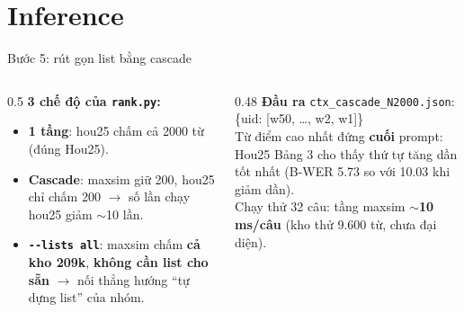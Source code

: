 \documentclass[aspectratio=169,xcolor=table]{beamer}
\newcommand{\hi}[1]{\textcolor{Primary}{\textbf{#1}}}
\begin{document}
\section{Inference}
\begin{frame}{Bước 5: rút gọn list bằng cascade}
\begin{center}
\end{center}
\vspace{0.1cm}
\footnotesize
\begin{columns}[T]
\begin{column}{0.5\textwidth}
\textbf{3 chế độ của \texttt{rank.py}:}
\begin{itemize}\itemsep2pt
\item \textbf{1 tầng}: hou25 chấm cả 2000 từ (đúng Hou25).
\item \textbf{Cascade}: maxsim giữ 200, hou25 chỉ chấm 200 $\rightarrow$ số lần chạy hou25 giảm $\sim$10 lần.
\item \textbf{\texttt{-{}-lists all}}: maxsim chấm \hi{cả kho 209k}, \textbf{không cần list cho sẵn} $\rightarrow$ nối thẳng hướng ``tự dựng list'' của nhóm.
\end{itemize}
\end{column}
\begin{column}{0.48\textwidth}
\textbf{Đầu ra} \texttt{ctx\_cascade\_N2000.json}:\\[2pt]
\colorbox{SoftGray}{\ttfamily\scriptsize \{uid: [w50, \dots, w2, w1]\}}\\[3pt]
Từ điểm cao nhất đứng \textbf{cuối} prompt: Hou25 Bảng 3 cho thấy thứ tự tăng dần tốt nhất (B-WER 5.73 so với 10.03 khi giảm dần).\\[3pt]
Chạy thử 32 câu: tầng maxsim $\sim$\textbf{10 ms/câu} (kho thử 9.600 từ, chưa đại diện).
\end{column}
\end{columns}
\end{frame}
\end{document}
